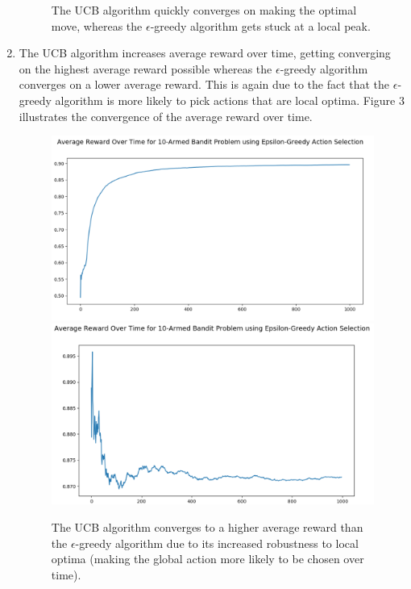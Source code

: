\documentclass{article}
\begin{document}
\begin{enumerate}
\begin{figure}[h]
	\caption{The UCB algorithm quickly converges on making the optimal move, whereas the $\epsilon$-greedy algorithm gets stuck at a local peak.}
	\end{figure}
	\item The UCB algorithm increases average reward over time, getting converging on the highest average reward possible whereas the $\epsilon$-greedy algorithm converges on a lower average reward. This is again due to the fact that the $\epsilon$-greedy algorithm is more likely to pick actions that are local optima. Figure 3 illustrates the convergence of the average reward over time.
	\begin{figure}[h]
	\centering
	\includegraphics[scale=0.2]{ucb_rew}
	\includegraphics[scale=0.2]{eps_rew}
	\caption{The UCB algorithm converges to a higher average reward than the $\epsilon$-greedy algorithm due to its increased robustness to local optima (making the global action more likely to be chosen over time).}
	\end{figure}
	\end{enumerate}
	
	
\end{document}
